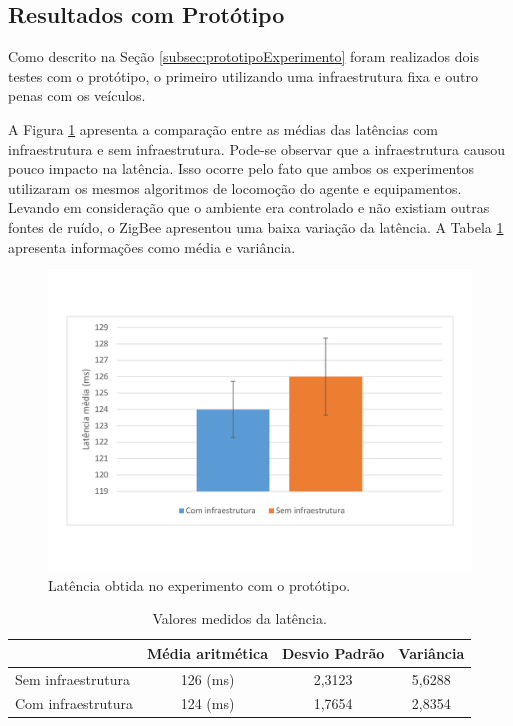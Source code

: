 \subsection{Resultados com Protótipo}

Como descrito na Seção \ref{subsec:prototipoExperimento} foram realizados dois testes com o protótipo, o primeiro utilizando uma infraestrutura fixa e outro penas com os veículos.

A Figura \ref{fig:experimentoRealLatencia} apresenta a comparação entre as médias das latências com infraestrutura e sem infraestrutura. Pode-se observar que a infraestrutura causou pouco impacto na latência. Isso ocorre pelo fato que ambos os experimentos utilizaram os mesmos algoritmos de locomoção do agente e equipamentos. Levando em consideração que o ambiente era controlado e não existiam outras fontes de ruído, o ZigBee apresentou uma baixa variação da latência. A Tabela \ref{tab:experimentoRealLatencia} apresenta informações como média e variância. 

\begin{figure}[htbp]
	\centering
	\includegraphics[scale=0.4]{resultados/graficos/experimentoRealLatencia.pdf}
	\caption{Latência obtida no experimento com o protótipo.}
	\label{fig:experimentoRealLatencia}
\end{figure}


\begin{table}[ht]
	\caption{Valores medidos da latência.}
	\centering
	\begin{tabular}{ | l | c | c | c|}
		\hline
		& Média aritmética & Desvio Padrão & Variância \\ \hline
		Sem infraestrutura & 126 (ms) & 2,3123 & 5,6288  \\ \hline
		Com infraestrutura & 124 (ms) & 1,7654 & 2,8354 \\ \hline
	\end{tabular}
	\label{tab:experimentoRealLatencia}
\end{table}

